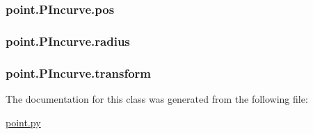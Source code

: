 \subsubsection[{pos}]{\setlength{\rightskip}{0pt plus 5cm}point.\+P\+Incurve.\+pos}\label{classpoint_1_1_p_incurve_aa300bcf39a6e3b82a724c3ea532dca12}
\hypertarget{classpoint_1_1_p_incurve_aa27d5e9be14491a217d09e1296e202bb}{}
\subsubsection[{radius}]{\setlength{\rightskip}{0pt plus 5cm}point.\+P\+Incurve.\+radius}\label{classpoint_1_1_p_incurve_aa27d5e9be14491a217d09e1296e202bb}
\hypertarget{classpoint_1_1_p_incurve_afdbd3540560247be0149ed28085af94e}{}
\subsubsection[{transform}]{\setlength{\rightskip}{0pt plus 5cm}point.\+P\+Incurve.\+transform}\label{classpoint_1_1_p_incurve_afdbd3540560247be0149ed28085af94e}


The documentation for this class was generated from the following file\+:\begin{DoxyCompactItemize}
\item 
\hyperlink{point_8py}{point.\+py}\end{DoxyCompactItemize}
